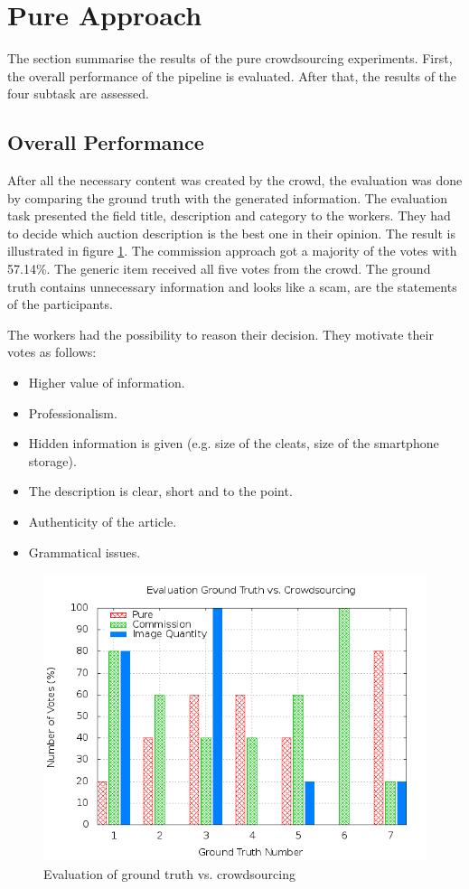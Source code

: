 \section{Pure Approach}
The section summarise the results of the pure crowdsourcing experiments. First, the overall performance of the pipeline is evaluated. After that, the results of the four subtask are assessed.
\subsection{Overall Performance}
After all the necessary content was created by the crowd, the evaluation was done by comparing the ground truth with the generated information. The evaluation task presented the field title, description and category to the workers. They had to decide which auction description is the best one in their opinion. The result is illustrated in figure \ref{crowdsourcing_eval}. The commission approach got a majority of the votes with 57.14\%. The generic item received all five votes from the crowd. The ground truth contains unnecessary information and looks like a scam, are the statements of the participants.

The workers had the possibility to reason their decision. They motivate their votes as follows: 
\begin{itemize}
	\item Higher value of information. 
	\item Professionalism. 
	\item Hidden information is given (e.g. size of the cleats, size of the smartphone storage). 
	\item The description is clear, short and to the point. 
	\item Authenticity of the article. 
	\item Grammatical issues. 
\end{itemize}
\begin{figure}
\centering
\includegraphics[scale=0.55]{images/plots/crowdsourcing/plot_evaluation_all.png}
\caption{Evaluation of ground truth vs. crowdsourcing}
\label{crowdsourcing_eval}
\end{figure}

